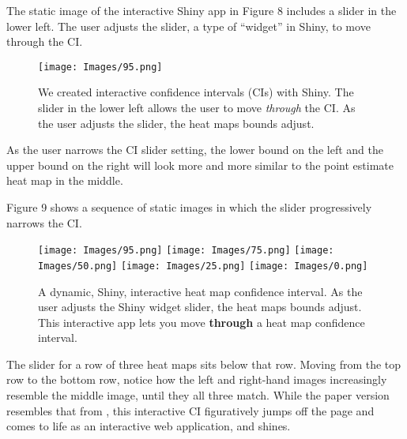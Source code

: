 The static image of the interactive Shiny app in Figure 8 includes a slider in the lower left. The user adjusts the slider, a type of ``widget'' in Shiny, to move through the CI.

  \begin{figure}[H]
	\centering
	\texttt{[image: Images/95.png]}
	\caption{We created interactive confidence intervals (CIs) with Shiny. The slider in the lower left allows the user to move {\it through} the CI. As the user adjusts the slider, the heat maps bounds adjust.}
	\end{figure}

As the user narrows the CI slider setting, the lower bound on the left and the upper bound on the right will look more and more similar to the point estimate heat map in the middle.

Figure 9 shows a sequence of static images in which the slider progressively narrows the CI.
  \begin{figure}[H]
	\centering
	\texttt{[image: Images/95.png]}
	\texttt{[image: Images/75.png]}
	\texttt{[image: Images/50.png]}
	\texttt{[image: Images/25.png]}
	\texttt{[image: Images/0.png]}
	\caption{A dynamic, Shiny, interactive heat map confidence interval. As the user adjusts the Shiny widget slider, the heat maps bounds adjust. This interactive app lets you move {\bf through} a heat map confidence interval.}
	\end{figure}

The slider for a row of three heat maps sits below that row. Moving from the top row to the bottom row, notice how the left and right-hand images increasingly resemble the middle image, until they all three match. While the paper version resembles that from \cite{Cross2015}, this interactive CI figuratively jumps off the page and comes to life as an interactive web application, and shines.



% 
%
% 
